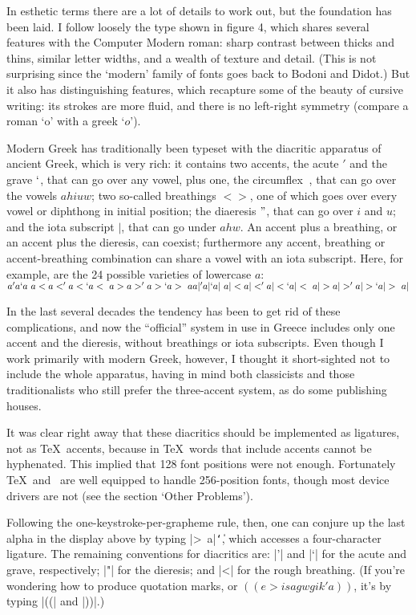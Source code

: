 In esthetic terms there are a lot of details to work out, but the
foundation has been laid.  I follow loosely the type shown in figure 4,
which shares several features with the Computer Modern roman:
sharp contrast between thicks and thins, similar letter widths,
and a wealth of texture and detail.  (This is not surprising since
the `modern' family of fonts goes back to Bodoni and Didot.)
But it also has distinguishing features, which recapture some of the
beauty of cursive writing: its strokes are more fluid, and there
is no left-right symmetry (compare a roman `o' with a greek `$o$').

Modern Greek has traditionally been typeset with the diacritic
apparatus of ancient Greek, which is very rich: it contains two accents,
the acute $'$ and the grave $`$, that can go over any vowel, plus one,
the circumflex $~$, that can go over the vowels $ahiuw$; two so-called
breathings $<>$, one of which goes over every vowel or diphthong
in initial position; the diaeresis $"$, that can go over $i$ and $u$;
and the iota subscript $|$, that can go under $ahw$.  An accent
plus a breathing, or an accent plus the dieresis, can coexist;
furthermore any accent, breathing or accent-breathing combination
can share a vowel with an iota subscript.  Here, for example,
are the 24 possible varieties of lowercase $a$:
\display
\hbox{$a 'a `a ~a <a <'a <`a <~a >a >'a >`a >~a
a| 'a| `a| ~a| <a| <'a| <`a| <~a| >a| >'a| >`a| >~a|$}
\display

In the last several decades the tendency has been to get rid of these
complications, and now the ``official'' system in use in Greece includes
only one accent and the dieresis, without breathings or iota subscripts.
Even though I work primarily with modern Greek, however, I thought
it short-sighted not to include the whole apparatus, having in mind
both classicists and those traditionalists who
still prefer the three-accent system, as do some publishing houses.

It was clear right away that these diacritics should be implemented as
ligatures, not as \TeX\ accents, because in \TeX\ words that include
accents cannot be hyphenated.  This implied that 128 font
positions were not enough.   Fortunately \TeX\ and \MF\ are
well equipped to handle 256-position fonts, though most device
drivers are not (see the section `Other Problems').

Following the one-keystroke-per-grapheme rule, then, one can conjure
up the last alpha in the display above by typing |>~a|{\tt\char`\|},
which accesses a four-character ligature.  The remaining conventions
for diacritics are: |'| and |`| for the acute and grave, respectively;
|"| for the dieresis; and |<| for the rough breathing.  (If you're
wondering how to produce quotation marks, or $((e>isagwgik'a))$,
it's by typing |((| and |))|.)

